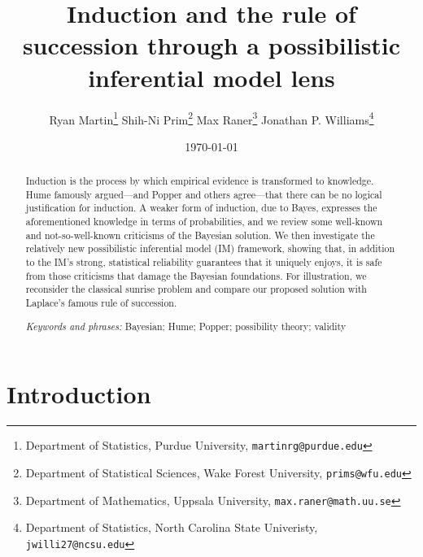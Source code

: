 \documentclass[a4paper, 12pt]{article}
\title{Induction and the rule of succession through a possibilistic inferential model lens}
\author{Ryan Martin\footnote{Department of Statistics, Purdue University, {\tt martinrg@purdue.edu}} \quad Shih-Ni Prim\footnote{Department of Statistical Sciences, Wake Forest University, {\tt prims@wfu.edu}} \quad Max Raner\footnote{Department of Mathematics, Uppsala University, {\tt max.raner@math.uu.se}} \quad Jonathan P. Williams\footnote{Department of Statistics, North Carolina State Univeristy, {\tt jwilli27@ncsu.edu}}}
\date{\today}
\theoremstyle{plain}
\theoremstyle{definition}
\theoremstyle{remark}
\begin{document}
\maketitle 

\begin{abstract}
Induction is the process by which empirical evidence is transformed to knowledge.  Hume famously argued---and Popper and others agree---that there can be no logical justification for induction.  A weaker form of induction, due to Bayes, expresses the aforementioned knowledge in terms of probabilities, and we review some well-known and not-so-well-known criticisms of the Bayesian solution.  We then investigate the relatively new possibilistic inferential model (IM) framework, showing that, in addition to the IM's strong, statistical reliability guarantees that it uniquely enjoys, it is safe from those criticisms that damage the Bayesian foundations.  For illustration, we reconsider the classical sunrise problem and compare our proposed solution with Laplace's famous rule of succession. 

\smallskip

\emph{Keywords and phrases:} Bayesian; Hume; Popper; possibility theory; validity
\end{abstract}




\section{Introduction}
\label{S:intro}
\end{document}
